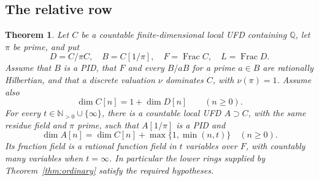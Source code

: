 \documentclass[11pt,reqno]{amsart}
\numberwithin{equation}{section}
\theoremstyle{plain}
\newtheorem{theorem}{Theorem}[section]
\theoremstyle{definition}
\theoremstyle{remark}
\begin{document}
\subsection{The relative row}

\begin{theorem}\label{thm:relative}
Let \(C\) be a countable finite-dimensional local UFD containing
\(\mathbb Q\), let \(\pi\) be prime, and put
\[
 D=C/\pi C,\quad B=C[1/\pi],\quad
 F=\operatorname{Frac}C,\quad L=\operatorname{Frac}D.
\]
Assume that \(B\) is a PID, that \(F\) and every \(B/aB\)
for a prime \(a\in B\) are rationally Hilbertian, and that a
discrete valuation \(\nu\) dominates \(C\), with
\(\nu(\pi)=1\).  Assume also
\begin{equation}\label{eq:relative-lower-profile}
\dim C[n]=1+\dim D[n]\qquad(n\ge0).
\end{equation}
For every \(t\in\mathbb N_{>0}\cup\{\infty\}\), there is
a countable local UFD \(A\supset C\), with the same residue
field and \(\pi\) prime, such that \(A[1/\pi]\) is a PID and
\begin{equation}\label{eq:relative-profile}
\dim A[n]=\dim C[n]+\max\{1,\min(n,t)\}\quad(n\ge0).
\end{equation}
Its fraction field is a rational function field in \(t\)
variables over \(F\), with countably many variables when
\(t=\infty\).  In particular the lower rings supplied by
Theorem~\ref{thm:ordinary} satisfy the required hypotheses.
\end{theorem}
\end{document}
